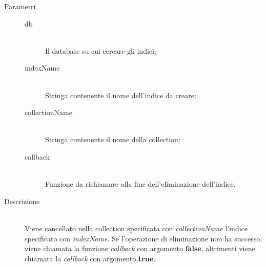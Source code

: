 \begin{description}
\begin{mldescription}
          \begin{description}
      	 \item[Parametri] \hfill
      	  \begin{description}
      	   \item[db] \hfill \\
      	   Il database su cui cercare gli indici;
      	   \item[indexName] \hfill \\
      	   Stringa contenente il nome dell'indice da creare;
      	   \item[collectionName] \hfill \\
      	   Stringa contenente il nome della collection;
      	   \item[callback] \hfill \\
      	   Funzione da richiamare alla fine dell'eliminazione dell'indice.
      	  \end{description}
      	 \item[Descrizione] \hfill \\
      	 Viene cancellato nella collection specificata con \textit{collectionName} l'indice specificato con \textit{indexName}. Se l'operazione di eliminazione non ha successo, viene chiamata la funzione \textit{callback} con argomento \textbf{false}, altrimenti viene chiamata la \textit{callback} con argomento \textbf{true}.  	 
      	\end{description} 	    
    
  \end{mldescription}
\end{description}

